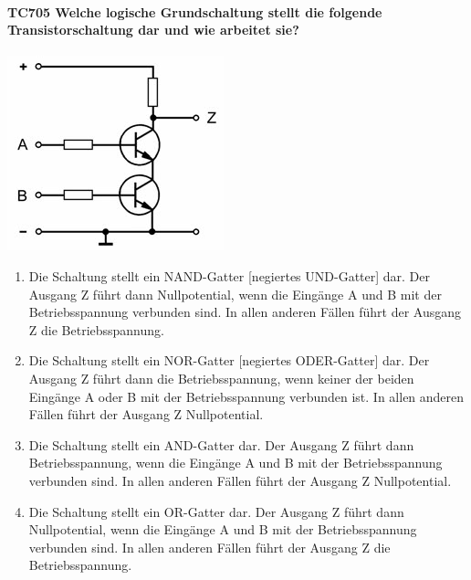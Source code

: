 \documentclass[8pt]{article}
\begin{document}
\begin{enumerate}
\begin{enumerate}[nolistsep,label=\Alph*]
{\begin{enumerate}[nolistsep,label=\Alph*]
\paragraph*{TC705 Welche logische Grundschaltung stellt die folgende Transistorschaltung dar und wie arbeitet sie?}
	\begin{center}
		\begin{minipage}{\linewidth}
			\centering
			\includegraphics[scale=1.0]{pics/tc705_a.jpg}
		\end{minipage}
	\end{center}
\begin{enumerate}[nolistsep,label=\Alph*]
\item Die Schaltung stellt ein NAND-Gatter [negiertes UND-Gatter] dar. Der Ausgang Z führt dann Nullpotential, wenn die Eingänge A und B mit der Betriebsspannung verbunden sind. In allen anderen Fällen führt der Ausgang Z die Betriebsspannung.
\item Die Schaltung stellt ein NOR-Gatter [negiertes ODER-Gatter] dar. Der Ausgang Z führt dann die Betriebsspannung, wenn keiner der beiden Eingänge A oder B mit der Betriebsspannung verbunden ist. In allen anderen Fällen führt der Ausgang Z Nullpotential.
\item Die Schaltung stellt ein AND-Gatter dar. Der Ausgang Z führt dann Betriebsspannung, wenn die Eingänge A und B mit der Betriebsspannung verbunden sind. In allen anderen Fällen führt der Ausgang Z Nullpotential. 
\item Die Schaltung stellt ein OR-Gatter dar. Der Ausgang Z führt dann Nullpotential, wenn die Eingänge A und B mit der Betriebsspannung verbunden sind. In allen anderen Fällen führt der Ausgang Z die Betriebsspannung.
\end{enumerate}


\end{enumerate}}
\end{enumerate}
\end{enumerate}
\end{document}
